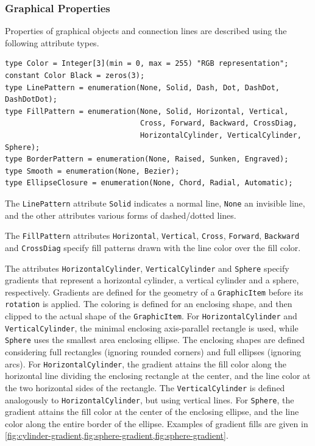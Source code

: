 \subsubsection{Graphical Properties}\label{graphical-properties}

Properties of graphical objects and connection lines are described using the following attribute types.
\begin{lstlisting}[language=modelica]
type Color = Integer[3](min = 0, max = 255) "RGB representation";
constant Color Black = zeros(3);
type LinePattern = enumeration(None, Solid, Dash, Dot, DashDot, DashDotDot);
type FillPattern = enumeration(None, Solid, Horizontal, Vertical,
                               Cross, Forward, Backward, CrossDiag,
                               HorizontalCylinder, VerticalCylinder, Sphere);
type BorderPattern = enumeration(None, Raised, Sunken, Engraved);
type Smooth = enumeration(None, Bezier);
type EllipseClosure = enumeration(None, Chord, Radial, Automatic);
\end{lstlisting}%
The \lstinline!LinePattern! attribute \lstinline!Solid! indicates a normal line, \lstinline!None! an invisible line, and the other attributes various forms of dashed/dotted lines.

The \lstinline!FillPattern! attributes \lstinline!Horizontal!, \lstinline!Vertical!, \lstinline!Cross!, \lstinline!Forward!, \lstinline!Backward! and \lstinline!CrossDiag! specify fill patterns drawn with the line color over the fill color.

The attributes \lstinline!HorizontalCylinder!, \lstinline!VerticalCylinder! and \lstinline!Sphere! specify gradients that represent a horizontal cylinder, a vertical cylinder and a sphere, respectively.
Gradients are defined for the geometry of a \lstinline!GraphicItem! before its \lstinline!rotation! is applied.
The coloring is defined for an enclosing shape, and then clipped to the actual shape of the \lstinline!GraphicItem!.
For \lstinline!HorizontalCylinder! and \lstinline!VerticalCylinder!, the minimal enclosing axis-parallel rectangle is used, while \lstinline!Sphere! uses the smallest area enclosing ellipse.
The enclosing shapes are defined considering full rectangles (ignoring rounded corners) and full ellipses (ignoring arcs).
For \lstinline!HorizontalCylinder!, the gradient attains the fill color along the horizontal line dividing the enclosing rectangle at the center, and the line color at the two horizontal sides of the rectangle.
The \lstinline!VerticalCylinder! is defined analogously to \lstinline!HorizontalCylinder!, but using vertical lines.
For \lstinline!Sphere!, the gradient attains the fill color at the center of the enclosing ellipse, and the line color along the entire border of the ellipse.
Examples of gradient fills are given in \cref{fig:cylinder-gradient,fig:sphere-gradient,fig:sphere-gradient}.

